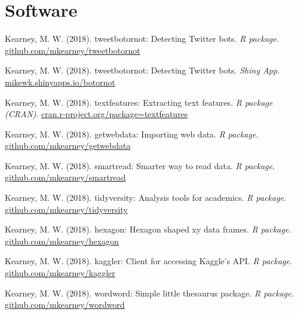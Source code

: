 \section{Software}

\begin{bibenum}

  \item Kearney, M. W. (2018).
    tweetbotornot: Detecting Twitter bots.
    \textit{R package}.
    \href{https://github.com/mkearney/tweetbotornot}{github.com/mkearney/tweetbotornot}

  \item Kearney, M. W. (2018).
    tweetbotornot: Detecting Twitter bots.
    \textit{Shiny App}.
    \href{https://mikewk.shinyapps.io/botornot/}{mikewk.shinyapps.io/botornot}

  \item Kearney, M. W. (2018).
    textfeatures: Extracting text features.
    \textit{R package (CRAN)}.
    \href{http://cran.r-project.org/package=textfeatures}{cran.r-project.org/package=textfeatures}

  \item Kearney, M. W. (2018).
    getwebdata: Importing web data.
    \textit{R package}.
    \href{https://github.com/mkearney/getwebdata}{github.com/mkearney/getwebdata}

  \item Kearney, M. W. (2018).
    smartread: Smarter way to read data.
    \textit{R package}.
    \href{https://github.com/mkearney/smartread}{github.com/mkearney/smartread}

  \item Kearney, M. W. (2018).
    tidyversity: Analysis tools for academics.
    \textit{R package}.
    \href{https://github.com/mkearney/tidyversity}{github.com/mkearney/tidyversity}

  \item Kearney, M. W. (2018).
    hexagon: Hexagon shaped xy data frames.
    \textit{R package}.
    \href{https://github.com/mkearney/hexagon}{github.com/mkearney/hexagon}

  \item Kearney, M. W. (2018).
    kaggler: Client for accessing Kaggle’s API.
    \textit{R package}.
    \href{https://github.com/mkearney/kaggler}{github.com/mkearney/kaggler}

  \item Kearney, M. W. (2018).
    wordword: Simple little thesaurus package.
    \textit{R package}.
    \href{https://github.com/mkearney/wordword}{github.com/mkearney/wordword}


\end{bibenum}

